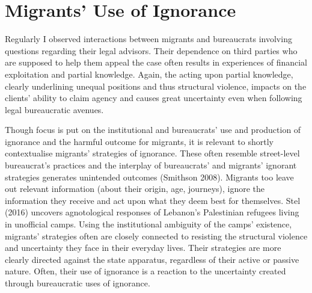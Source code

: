 \section{Migrants' Use of Ignorance}
Regularly I observed interactions between migrants and bureaucrats involving questions regarding their legal advisors. Their dependence on third parties who are supposed to help them appeal the case often results in experiences of financial exploitation and partial knowledge. Again, the acting upon partial knowledge, clearly underlining unequal positions and thus structural violence, impacts on the clients’ ability to claim agency and causes great uncertainty even when following legal bureaucratic avenues.
\par
Though focus is put on the institutional and bureaucrats’ use and production of ignorance and the harmful outcome for migrants, it is relevant to shortly contextualise migrants’ strategies of ignorance. These often resemble street-level bureaucrat’s practices and the interplay of bureaucrats’ and migrants’ ignorant strategies generates unintended outcomes (Smithson 2008). Migrants too leave out relevant information (about their origin, age, journeys), ignore the information they receive and act upon what they deem best for themselves. Stel (2016) uncovers agnotological responses of Lebanon’s Palestinian refugees living in unofficial camps. Using the institutional ambiguity of the camps’ existence, migrants’ strategies often are closely connected to resisting the structural violence and uncertainty they face in their everyday lives. Their strategies are more clearly directed against the state apparatus, regardless of their active or passive nature. Often, their use of ignorance is a reaction to the uncertainty created through bureaucratic uses of ignorance.
\par
